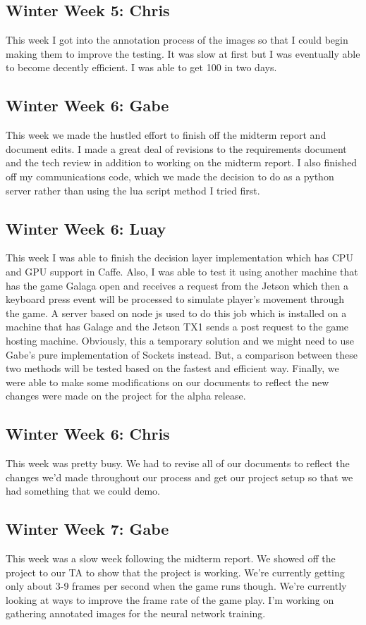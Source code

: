 \documentclass[onecolumn, draftclsnofoot,10pt, compsoc]{IEEEtran}
\begin{document}
\subsection{Winter Week 5: Chris}
This week I got into the annotation process of the images so that I could begin making them to improve the testing. It was slow at first but I was eventually able to become decently efficient. I was able to get 100 in two days.
\subsection{Winter Week 6: Gabe}
This week we made the hustled effort to finish off the midterm report and document edits. I made a great deal of revisions to the requirements document and the tech review in addition to working on the midterm report. I also finished off my communications code, which we made the decision to do as a python server rather than using the lua script method I tried first.
\subsection{Winter Week 6: Luay}
This week I was able to finish the decision layer implementation which has CPU and GPU support in Caffe. Also, I was able to test it using another machine that has the game Galaga open and receives a request from the Jetson which then a keyboard press event will be processed to simulate player's movement through the game. A server based on node js used to do this job which is installed on a machine that has Galage and the Jetson TX1 sends a post request to the game hosting machine. Obviously, this a temporary solution and we might need to use Gabe's pure implementation of Sockets instead. But, a comparison between these two methods will be tested based on the fastest and efficient way. Finally, we were able to make some modifications on our documents to reflect the new changes were made on the project for the alpha release.
\subsection{Winter Week 6: Chris}
This week was pretty busy. We had to revise all of our documents to reflect the changes we'd made throughout our process and get our project setup so that we had something that we could demo.
\subsection{Winter Week 7: Gabe}
This week was a slow week following the midterm report. We showed off the project to our TA to show that the project is working. We're currently getting only about 3-9 frames per second when the game runs though. We're currently looking at ways to improve the frame rate of the game play. I'm working on gathering annotated images for the neural network training.
\end{document}
